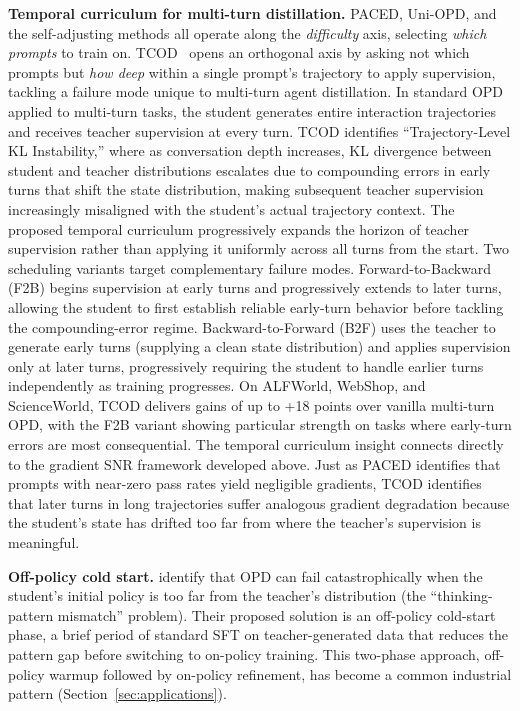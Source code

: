 \documentclass{article} %
\begin{document}
\textbf{Temporal curriculum for multi-turn distillation.} PACED, Uni-OPD, and the self-adjusting methods all operate along the \emph{difficulty} axis, selecting \emph{which prompts} to train on. TCOD~\citep{chen2026tcod} opens an orthogonal axis by asking not which prompts but \emph{how deep} within a single prompt's trajectory to apply supervision, tackling a failure mode unique to multi-turn agent distillation. In standard OPD applied to multi-turn tasks, the student generates entire interaction trajectories and receives teacher supervision at every turn. TCOD identifies ``Trajectory-Level KL Instability,'' where as conversation depth increases, KL divergence between student and teacher distributions escalates due to compounding errors in early turns that shift the state distribution, making subsequent teacher supervision increasingly misaligned with the student's actual trajectory context. The proposed temporal curriculum progressively expands the horizon of teacher supervision rather than applying it uniformly across all turns from the start. Two scheduling variants target complementary failure modes. Forward-to-Backward (F2B) begins supervision at early turns and progressively extends to later turns, allowing the student to first establish reliable early-turn behavior before tackling the compounding-error regime. Backward-to-Forward (B2F) uses the teacher to generate early turns (supplying a clean state distribution) and applies supervision only at later turns, progressively requiring the student to handle earlier turns independently as training progresses. On ALFWorld, WebShop, and ScienceWorld, TCOD delivers gains of up to +18 points over vanilla multi-turn OPD, with the F2B variant showing particular strength on tasks where early-turn errors are most consequential. The temporal curriculum insight connects directly to the gradient SNR framework developed above. Just as PACED identifies that prompts with near-zero pass rates yield negligible gradients, TCOD identifies that later turns in long trajectories suffer analogous gradient degradation because the student's state has drifted too far from where the teacher's supervision is meaningful.

\textbf{Off-policy cold start.} \citet{li2026rethinking} identify that OPD can fail catastrophically when the student's initial policy is too far from the teacher's distribution (the ``thinking-pattern mismatch'' problem). Their proposed solution is an off-policy cold-start phase, a brief period of standard SFT on teacher-generated data that reduces the pattern gap before switching to on-policy training. This two-phase approach, off-policy warmup followed by on-policy refinement, has become a common industrial pattern (Section~\ref{sec:applications}).
\end{document}
